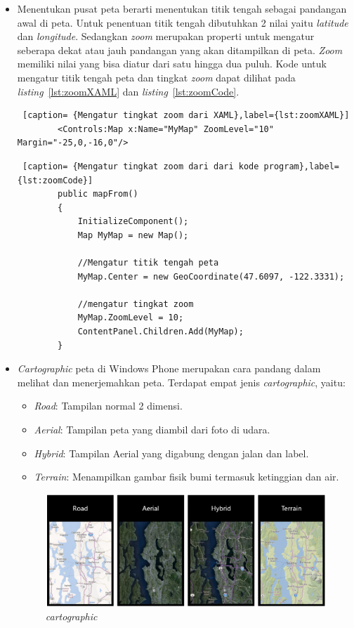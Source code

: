 \begin{itemize}
	\item Menentukan pusat peta berarti menentukan titik tengah sebagai pandangan awal di peta. Untuk penentuan titik tengah dibutuhkan 2 nilai yaitu \textit{latitude} dan \textit{longitude}. Sedangkan \textit{zoom} merupakan properti untuk mengatur seberapa dekat atau jauh pandangan yang akan ditampilkan di peta. \textit{Zoom} memiliki nilai yang bisa diatur dari satu hingga dua puluh. Kode untuk mengatur titik tengah peta dan tingkat \textit{zoom} dapat dilihat pada \textit{listing}~\ref{lst:zoomXAML} dan \textit{listing}~\ref{lst:zoomCode}.\\
	
	\begin{lstlisting} [caption= {Mengatur tingkat zoom dari XAML},label={lst:zoomXAML}]
		<Controls:Map x:Name="MyMap" ZoomLevel="10" Margin="-25,0,-16,0"/>
	\end{lstlisting}

	\begin{lstlisting} [caption= {Mengatur tingkat zoom dari dari kode program},label={lst:zoomCode}]
		public mapFrom()
		{
			InitializeComponent();
			Map MyMap = new Map();

			//Mengatur titik tengah peta
			MyMap.Center = new GeoCoordinate(47.6097, -122.3331);

			//mengatur tingkat zoom
			MyMap.ZoomLevel = 10;
			ContentPanel.Children.Add(MyMap);
		}
	\end{lstlisting}

	
	\item \textit{Cartographic} peta di Windows Phone merupakan cara pandang dalam melihat dan menerjemahkan peta. Terdapat empat jenis \textit{cartographic}, yaitu:
		
		\begin{itemize}
			\item \textit{Road}: Tampilan normal 2 dimensi.
			\item \textit{Aerial}: Tampilan peta yang diambil dari foto di udara.
			\item \textit{Hybrid}: Tampilan Aerial yang digabung dengan jalan dan label.
			\item \textit{Terrain}: Menampilkan gambar fisik bumi termasuk ketinggian dan air.
		\end{itemize}
		
		\begin{figure}[h]
			\centering
				\includegraphics[scale=0.4]{Gambar/kartografi}
			\caption{\textit{cartographic}}
			\label{fig:cartographic}
		\end{figure}
		

\end{itemize}

